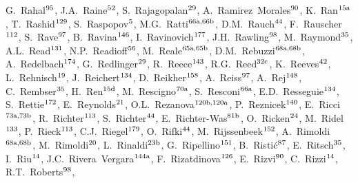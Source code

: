 \begin{flushleft}
G.~Rahal$^\textrm{\scriptsize 95}$,    
J.A.~Raine$^\textrm{\scriptsize 52}$,    
S.~Rajagopalan$^\textrm{\scriptsize 29}$,    
A.~Ramirez~Morales$^\textrm{\scriptsize 90}$,    
K.~Ran$^\textrm{\scriptsize 15a}$,    
T.~Rashid$^\textrm{\scriptsize 129}$,    
S.~Raspopov$^\textrm{\scriptsize 5}$,    
M.G.~Ratti$^\textrm{\scriptsize 66a,66b}$,    
D.M.~Rauch$^\textrm{\scriptsize 44}$,    
F.~Rauscher$^\textrm{\scriptsize 112}$,    
S.~Rave$^\textrm{\scriptsize 97}$,    
B.~Ravina$^\textrm{\scriptsize 146}$,    
I.~Ravinovich$^\textrm{\scriptsize 177}$,    
J.H.~Rawling$^\textrm{\scriptsize 98}$,    
M.~Raymond$^\textrm{\scriptsize 35}$,    
A.L.~Read$^\textrm{\scriptsize 131}$,    
N.P.~Readioff$^\textrm{\scriptsize 56}$,    
M.~Reale$^\textrm{\scriptsize 65a,65b}$,    
D.M.~Rebuzzi$^\textrm{\scriptsize 68a,68b}$,    
A.~Redelbach$^\textrm{\scriptsize 174}$,    
G.~Redlinger$^\textrm{\scriptsize 29}$,    
R.~Reece$^\textrm{\scriptsize 143}$,    
R.G.~Reed$^\textrm{\scriptsize 32c}$,    
K.~Reeves$^\textrm{\scriptsize 42}$,    
L.~Rehnisch$^\textrm{\scriptsize 19}$,    
J.~Reichert$^\textrm{\scriptsize 134}$,    
D.~Reikher$^\textrm{\scriptsize 158}$,    
A.~Reiss$^\textrm{\scriptsize 97}$,    
A.~Rej$^\textrm{\scriptsize 148}$,    
C.~Rembser$^\textrm{\scriptsize 35}$,    
H.~Ren$^\textrm{\scriptsize 15d}$,    
M.~Rescigno$^\textrm{\scriptsize 70a}$,    
S.~Resconi$^\textrm{\scriptsize 66a}$,    
E.D.~Resseguie$^\textrm{\scriptsize 134}$,    
S.~Rettie$^\textrm{\scriptsize 172}$,    
E.~Reynolds$^\textrm{\scriptsize 21}$,    
O.L.~Rezanova$^\textrm{\scriptsize 120b,120a}$,    
P.~Reznicek$^\textrm{\scriptsize 140}$,    
E.~Ricci$^\textrm{\scriptsize 73a,73b}$,    
R.~Richter$^\textrm{\scriptsize 113}$,    
S.~Richter$^\textrm{\scriptsize 44}$,    
E.~Richter-Was$^\textrm{\scriptsize 81b}$,    
O.~Ricken$^\textrm{\scriptsize 24}$,    
M.~Ridel$^\textrm{\scriptsize 133}$,    
P.~Rieck$^\textrm{\scriptsize 113}$,    
C.J.~Riegel$^\textrm{\scriptsize 179}$,    
O.~Rifki$^\textrm{\scriptsize 44}$,    
M.~Rijssenbeek$^\textrm{\scriptsize 152}$,    
A.~Rimoldi$^\textrm{\scriptsize 68a,68b}$,    
M.~Rimoldi$^\textrm{\scriptsize 20}$,    
L.~Rinaldi$^\textrm{\scriptsize 23b}$,    
G.~Ripellino$^\textrm{\scriptsize 151}$,    
B.~Risti\'{c}$^\textrm{\scriptsize 87}$,    
E.~Ritsch$^\textrm{\scriptsize 35}$,    
I.~Riu$^\textrm{\scriptsize 14}$,    
J.C.~Rivera~Vergara$^\textrm{\scriptsize 144a}$,    
F.~Rizatdinova$^\textrm{\scriptsize 126}$,    
E.~Rizvi$^\textrm{\scriptsize 90}$,    
C.~Rizzi$^\textrm{\scriptsize 14}$,    
R.T.~Roberts$^\textrm{\scriptsize 98}$,    

\end{flushleft}
